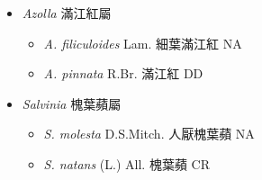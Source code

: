
  \begin{itemize}
 \item[] \textit{Azolla} 滿江紅屬
                                
  \begin{itemize}
        \item[] \textit{A. filiculoides} Lam.  細葉滿江紅   NA
        \item[] \textit{A. pinnata} R.Br.  滿江紅   DD
  \end{itemize}
 \item[] \textit{Salvinia} 槐葉蘋屬
                                
  \begin{itemize}
        \item[] \textit{S. molesta} D.S.Mitch.  人厭槐葉蘋   NA
        \item[] \textit{S. natans} (L.) All.  槐葉蘋   CR
  \end{itemize}
  \end{itemize}
